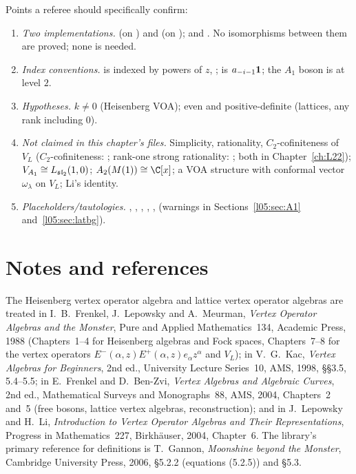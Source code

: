 Points a referee should specifically confirm:
\begin{enumerate}
\item \emph{Two implementations.}  (on ) and  (on );
   and . No isomorphisms between them are proved; none is needed.
\item \emph{Index conventions.}  is indexed by powers of $z$, ;  is
  $a_{-i-1}\mathbf{1}$; the $A_1$ boson is at level $2$.
\item \emph{Hypotheses.} $k\ne0$ (Heisenberg VOA); even and positive-definite (lattices, any rank including $0$).
\item \emph{Not claimed in this chapter's files.} Simplicity, rationality, $C_2$-cofiniteness of $V_L$
  ($C_2$-cofiniteness: ; rank-one strong rationality: ;
  both in Chapter~\ref{ch:L22}); $V_{A_1}\cong L_{\mathfrak{sl}_2}(1,0)$;
  $\lfiveA(M(1))\cong\C[x]$; a VOA structure with conformal vector $\omega_\lambda$ on $V_L$; Li's identity.
\item \emph{Placeholders/tautologies.} , , ,
  , ,  (warnings in
  Sections~\ref{l05:sec:A1} and~\ref{l05:sec:latbg}).
\end{enumerate}

\section*{Notes and references}
\label{l05:sec:notes}

The Heisenberg vertex operator algebra and lattice vertex operator algebras are treated in I.~B.~Frenkel,
J.~Lepowsky and A.~Meurman, \emph{Vertex Operator Algebras and the Monster}, Pure and Applied Mathematics~134, Academic
Press, 1988 (Chapters~1--4 for Heisenberg algebras and Fock spaces, Chapters~7--8 for the vertex operators
$E^-(\alpha,z)E^+(\alpha,z)e_\alpha z^\alpha$ and $V_L$); in V.~G.~Kac, \emph{Vertex Algebras for Beginners}, 2nd ed., University
Lecture Series~10, AMS, 1998, \S\S3.5, 5.4--5.5; in E.~Frenkel and D.~Ben-Zvi, \emph{Vertex Algebras and Algebraic Curves},
2nd ed., Mathematical Surveys and Monographs~88, AMS, 2004, Chapters~2 and~5 (free bosons, lattice vertex algebras,
reconstruction); and in J.~Lepowsky and H.~Li, \emph{Introduction to Vertex Operator Algebras and Their Representations},
Progress in Mathematics~227, Birkh\"auser, 2004, Chapter~6. The library's primary reference for definitions is T.~Gannon,
\emph{Moonshine beyond the Monster}, Cambridge University Press, 2006, \S5.2.2 (equations (5.2.5)) and \S5.3.

